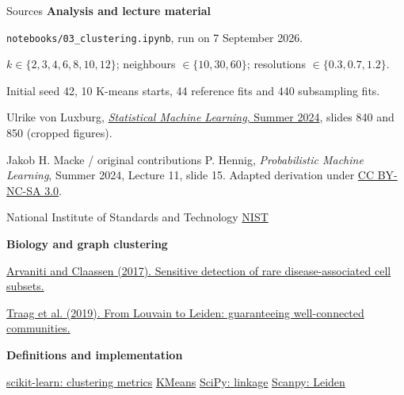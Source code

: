\begin{frame}{Sources}
  \footnotesize
  \textbf{Analysis and lecture material}\par
  \texttt{notebooks/03\_clustering.ipynb}, run on 7 September 2026.\par
  $k\in\{2,3,4,6,8,10,12\}$; neighbours $\in\{10,30,60\}$; resolutions $\in\{0.3,0.7,1.2\}$.\par
  Initial seed 42, 10 K-means starts, 44 reference fits and 440 subsampling fits.\par
  Ulrike von Luxburg, \href{https://www.tml.cs.uni-tuebingen.de/teaching/2024_statistical_learning/downloads_free/vorlesung_main.pdf}{\emph{Statistical Machine Learning}, Summer 2024}, slides 840 and 850 (cropped figures).\par
  Jakob H. Macke / original contributions P. Hennig, \emph{Probabilistic Machine Learning}, Summer 2024, Lecture 11, slide 15. Adapted derivation under \href{https://creativecommons.org/licenses/by-nc-sa/3.0/}{CC BY-NC-SA 3.0}.\par
National Institute of Standards and Technology \href{https://www.itl.nist.gov/div898/software/dataplot/refman2/auxillar/iqrange.htm}{NIST} \par
  \vspace{2mm}
  \textbf{Biology and graph clustering}\par

  \href{https://doi.org/10.1038/ncomms14825}{Arvaniti and Claassen (2017). Sensitive detection of rare disease-associated cell subsets.}\par
  \href{https://doi.org/10.1038/s41598-019-41695-z}{Traag et al. (2019). From Louvain to Leiden: guaranteeing well-connected communities.}\par
  \vspace{2mm}
  \textbf{Definitions and implementation}\par
  \href{https://scikit-learn.org/stable/modules/clustering.html}{scikit-learn: clustering metrics}\quad
  \href{https://scikit-learn.org/stable/modules/generated/sklearn.cluster.KMeans.html}{KMeans}\quad
  \href{https://docs.scipy.org/doc/scipy/reference/generated/scipy.cluster.hierarchy.linkage.html}{SciPy: linkage}\quad
  \href{https://scanpy.readthedocs.io/en/stable/api/generated/scanpy.tl.leiden.html}{Scanpy: Leiden}
\end{frame}
